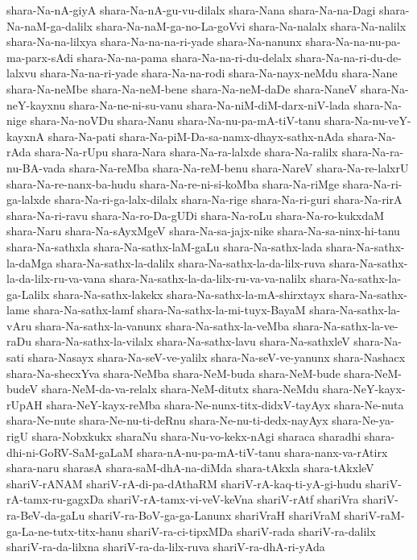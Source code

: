 {shara-Na-nA-giyA
shara-Na-nA-gu-vu-dilalx
shara-Nana
shara-Na-na-Dagi
shara-Na-naM-ga-dalilx
shara-Na-naM-ga-no-La-goVvi
shara-Na-nalalx
shara-Na-nalilx
shara-Na-na-lilxya
shara-Na-na-na-ri-yade
shara-Na-nanunx
shara-Na-na-nu-pa-ma-parx-sAdi
shara-Na-na-pama
shara-Na-na-ri-du-delalx
shara-Na-na-ri-du-de-lalxvu
shara-Na-na-ri-yade
shara-Na-na-rodi
shara-Na-nayx-neMdu
shara-Nane
shara-Na-neMbe
shara-Na-neM-bene
shara-Na-neM-daDe
shara-NaneV
shara-Na-neY-kayxnu
shara-Na-ne-ni-su-vanu
shara-Na-niM-diM-darx-niV-lada
shara-Na-nige
shara-Na-noVDu
shara-Nanu
shara-Na-nu-pa-mA-tiV-tanu
shara-Na-nu-veY-kayxnA
shara-Na-pati
shara-Na-piM-Da-sa-namx-dhayx-sathx-nAda
shara-Na-rAda
shara-Na-rUpu
shara-Nara
shara-Na-ra-lalxde
shara-Na-ralilx
shara-Na-ra-nu-BA-vada
shara-Na-reMba
shara-Na-reM-benu
shara-NareV
shara-Na-re-lalxrU
shara-Na-re-nanx-ba-hudu
shara-Na-re-ni-si-koMba
shara-Na-riMge
shara-Na-ri-ga-lalxde
shara-Na-ri-ga-lalx-dilalx
shara-Na-rige
shara-Na-ri-guri
shara-Na-rirA
shara-Na-ri-ravu
shara-Na-ro-Da-gUDi
shara-Na-roLu
shara-Na-ro-kukxdaM
shara-Naru
shara-Na-sAyxMgeV
shara-Na-sa-jajx-nike
shara-Na-sa-ninx-hi-tanu
shara-Na-sathxla
shara-Na-sathx-laM-gaLu
shara-Na-sathx-lada
shara-Na-sathx-la-daMga
shara-Na-sathx-la-dalilx
shara-Na-sathx-la-da-lilx-ruva
shara-Na-sathx-la-da-lilx-ru-va-vana
shara-Na-sathx-la-da-lilx-ru-va-va-nalilx
shara-Na-sathx-la-ga-Lalilx
shara-Na-sathx-lakekx
shara-Na-sathx-la-mA-shirxtayx
shara-Na-sathx-lame
shara-Na-sathx-lamf
shara-Na-sathx-la-mi-tuyx-BayaM
shara-Na-sathx-la-vAru
shara-Na-sathx-la-vanunx
shara-Na-sathx-la-veMba
shara-Na-sathx-la-ve-raDu
shara-Na-sathx-la-vilalx
shara-Na-sathx-lavu
shara-Na-sathxleV
shara-Na-sati
shara-Nasayx
shara-Na-seV-ve-yalilx
shara-Na-seV-ve-yanunx
shara-Nashacx
shara-Na-shecxYva
shara-NeMba
shara-NeM-buda
shara-NeM-bude
shara-NeM-budeV
shara-NeM-da-va-relalx
shara-NeM-ditutx
shara-NeMdu
shara-NeY-kayx-rUpAH
shara-NeY-kayx-reMba
shara-Ne-nunx-titx-didxV-tayAyx
shara-Ne-nuta
shara-Ne-nute
shara-Ne-nu-ti-deRnu
shara-Ne-nu-ti-dedx-nayAyx
shara-Ne-ya-rigU
shara-Nobxkukx
sharaNu
shara-Nu-vo-kekx-nAgi
sharaca
sharadhi
shara-dhi-ni-GoRV-SaM-gaLaM
shara-nA-nu-pa-mA-tiV-tanu
shara-nanx-va-rAtirx
shara-naru
sharasA
shara-saM-dhA-na-diMda
shara-tAkxla
shara-tAkxleV
shariV-rANAM
shariV-rA-di-pa-dAthaRM
shariV-rA-kaq-ti-yA-gi-hudu
shariV-rA-tamx-ru-gagxDa
shariV-rA-tamx-vi-veV-keVna
shariV-rAtf
shariVra
shariV-ra-BeV-da-gaLu
shariV-ra-BoV-ga-ga-Lanunx
shariVraH
shariVraM
shariV-raM-ga-La-ne-tutx-titx-hanu
shariV-ra-ci-tipxMDa
shariV-rada
shariV-ra-dalilx
shariV-ra-da-lilxna
shariV-ra-da-lilx-ruva
shariV-ra-dhA-ri-yAda
}
